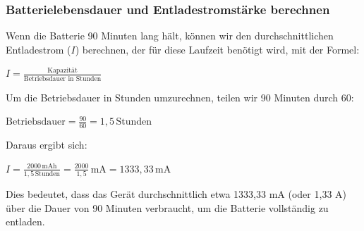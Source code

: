 \documentclass{vorlage-design-main}
\begin{document}
\hypertarget{batterielebensdauer-und-entladestromstuxe4rke-berechnen}{%
\subsubsection{Batterielebensdauer und Entladestromstärke
berechnen}\label{batterielebensdauer-und-entladestromstaerke-berechnen}}

Wenn die Batterie 90 Minuten lang hält, können wir den
durchschnittlichen Entladestrom ($I$) berechnen, der für diese
Laufzeit benötigt wird, mit der Formel:

$I = \frac{\text{Kapazität}}{\text{Betriebsdauer in Stunden}}$

Um die Betriebsdauer in Stunden umzurechnen, teilen wir 90 Minuten durch
60:

$\text{Betriebsdauer} = \frac{90}{60} = 1,5 \, \text{Stunden}$

Daraus ergibt sich:

$I = \frac{2000 \, \text{mAh}}{1,5 \, \text{Stunden}} = \frac{2000}{1,5} \, \text{mA} = 1333,33 \, \text{mA}$

Dies bedeutet, dass das Gerät durchschnittlich etwa 1333,33 mA (oder
1,33 A) über die Dauer von 90 Minuten verbraucht, um die Batterie
vollständig zu entladen. %


\clearpage
\printbibliography
\end{document}
